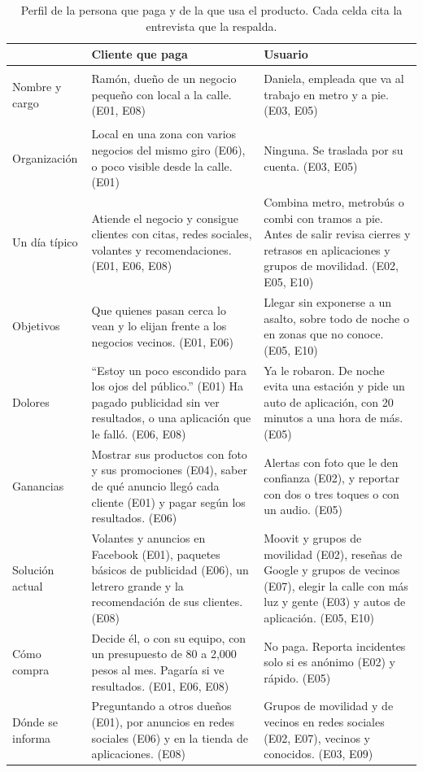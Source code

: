 \documentclass[11pt]{article}
\begin{document}
\begin{table}[H]
  \caption{Perfil de la persona que paga y de la que usa el producto. Cada celda cita la
    entrevista que la respalda.}
  \label{tab:persona}
  \footnotesize
  \renewcommand{\arraystretch}{1.15}
  \begin{tabularx}{\textwidth}{@{}>{\bfseries\raggedright}p{}
                                  >{\raggedright\arraybackslash}X>{\raggedright\arraybackslash}X@{}}
    \toprule
    & Cliente que paga & Usuario \\
    \midrule
    Nombre y cargo & Ramón, dueño de un negocio pequeño con local a la calle. (E01, E08) &
      Daniela, empleada que va al trabajo en metro y a pie. (E03, E05) \\
    Organización & Local en una zona con varios negocios del mismo giro (E06), o poco visible
      desde la calle. (E01) & Ninguna. Se traslada por su cuenta. (E03, E05) \\
    Un día típico & Atiende el negocio y consigue clientes con citas, redes sociales, volantes y
      recomendaciones. (E01, E06, E08) & Combina metro, metrobús o combi con tramos a pie. Antes de
      salir revisa cierres y retrasos en aplicaciones y grupos de movilidad. (E02, E05, E10) \\
    Objetivos & Que quienes pasan cerca lo vean y lo elijan frente a los negocios vecinos. (E01,
      E06) & Llegar sin exponerse a un asalto, sobre todo de noche o en zonas que no conoce. (E05,
      E10) \\
    Dolores & ``Estoy un poco escondido para los ojos del público.'' (E01) Ha pagado publicidad
      sin ver resultados, o una aplicación que le falló. (E06, E08) & Ya le robaron. De noche evita
      una estación y pide un auto de aplicación, con 20 minutos a una hora de más. (E05) \\
    Ganancias & Mostrar sus productos con foto y sus promociones (E04), saber de qué anuncio llegó
      cada cliente (E01) y pagar según los resultados. (E06) & Alertas con foto que le den
      confianza (E02), y reportar con dos o tres toques o con un audio. (E05) \\
    Solución actual & Volantes y anuncios en Facebook (E01), paquetes básicos de publicidad
      (E06), un letrero grande y la recomendación de sus clientes. (E08) & Moovit y grupos de
      movilidad (E02), reseñas de Google y grupos de vecinos (E07), elegir la calle con más luz y
      gente (E03) y autos de aplicación. (E05, E10) \\
    Cómo compra & Decide él, o con su equipo, con un presupuesto de 80 a 2,000 pesos al mes.
      Pagaría si ve resultados. (E01, E06, E08) & No paga. Reporta incidentes solo si es anónimo
      (E02) y rápido. (E05) \\
    Dónde se informa & Preguntando a otros dueños (E01), por anuncios en redes sociales (E06) y en
      la tienda de aplicaciones. (E08) & Grupos de movilidad y de vecinos en redes sociales (E02,
      E07), vecinos y conocidos. (E03, E09) \\
    \bottomrule
  \end{tabularx}
\end{table}
\end{document}
